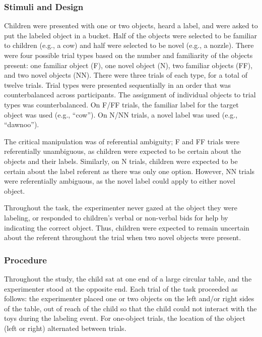 \documentclass[a4paper,man,apacite,floatsintext]{apa6}
\begin{document}
\subsubsection{Stimuli and Design}\label{stimuli-and-design}

Children were presented with one or two objects, heard a label, and were
asked to put the labeled object in a bucket. Half of the objects were
selected to be familiar to children (e.g., a cow) and half were selected
to be novel (e.g., a nozzle). There were four possible trial types based
on the number and familiarity of the objects present: one familiar
object (F), one novel object (N), two familiar objects (FF), and two
novel objects (NN). There were three trials of each type, for a total of
twelve trials. Trial types were presented sequentially in an order that
was counterbalanced across participants. The assignment of individual
objects to trial types was counterbalanced. On F/FF trials, the familiar
label for the target object was used (e.g., ``cow''). On N/NN trials, a
novel label was used (e.g., ``dawnoo'').

The critical manipulation was of referential ambiguity; F and FF trials
were referentially unambiguous, as children were expected to be certain
about the objects and their labels. Similarly, on N trials, children
were expected to be certain about the label referent as there was only
one option. However, NN trials were referentially ambiguous, as the
novel label could apply to either novel object.

Throughout the task, the experimenter never gazed at the object they
were labeling, or responded to children's verbal or non-verbal bids for
help by indicating the correct object. Thus, children were expected to
remain uncertain about the referent throughout the trial when two novel
objects were present.

\subsubsection{Procedure}\label{procedure}

Throughout the study, the child sat at one end of a large circular
table, and the experimenter stood at the opposite end. Each trial of the
task proceeded as follows: the experimenter placed one or two objects on
the left and/or right sides of the table, out of reach of the child so
that the child could not interact with the toys during the labeling
event. For one-object trials, the location of the object (left or right)
alternated between trials.
\end{document}
